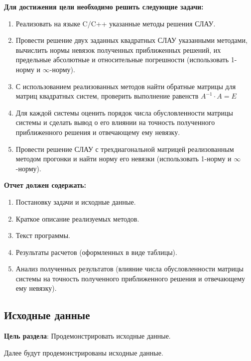 \documentclass[12pt, a4paper]{article}
\begin{document}
	\vspace{5mm}
	\textbf{Для достижения цели необходимо решить следующие задачи:}
	\vspace{5mm}
	\begin{enumerate}
		\item Реализовать на языке C/C++ указанные методы решения СЛАУ.
		\item Провести решение двух заданных квадратных СЛАУ указанными методами, вычислить нормы невязок полученных приближенных решений, их предельные абсолютные и относительные погрешности (использовать 1-норму и $\infty$-норму).
		\item С использованием реализованных методов найти обратные матрицы для матриц квадратных систем, проверить выполнение равенств $ A^{-1}\cdot A=E$
		\item Для каждой системы оценить порядок числа обусловленности матрицы системы и сделать вывод о его влиянии на точность полученного приближенного решения и отвечающему ему невязку. 
		\item Провести решение СЛАУ с трехдиагональной матрицей реализованным методом прогонки и найти норму его невязки (использовать 1-норму и $\infty$-норму).

	\end{enumerate}

\vspace{5mm}
	\textbf{Отчет должен содержать:}
	\vspace{5mm}
	\begin{enumerate}
		\item  Постановку задачи и исходные данные.
		\item Краткое описание реализуемых методов. 
		\item Текст программы.
		\item  Результаты расчетов (оформленных в виде таблицы).
 		\item  Анализ полученных результатов (влияние числа обусловленности матрицы системы на точность полученного приближенного решения и отвечающему ему невязку).
	\end{enumerate}
    	\newpage
	\begin{center}
		\section*{Исходные данные} 
        \textbf{Цель раздела}: Продемонстрировать исходные данные.
	\end{center}
    \newline Далее будут продемонстрированы исходные данные.
\end{document}
